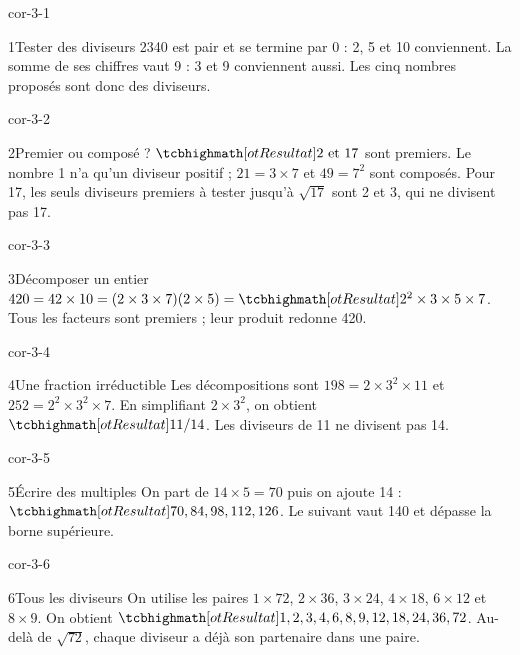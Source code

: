 \clearpage\pagestyle{otMain}\fontsize{11}{15}\selectfont{}
\begin{blocLivre}{cor-3-1}\begin{corrige}{1}{Tester des diviseurs}
2340 est pair et se termine par 0 : 2, 5 et 10 conviennent. La somme de ses chiffres vaut 9 : 3 et 9 conviennent aussi. Les cinq nombres proposés sont donc des diviseurs.
\end{corrige}\end{blocLivre}
\begin{blocLivre}{cor-3-2}\begin{corrige}{2}{Premier ou composé ?}
$\res{2\text{ et }17}$ sont premiers. Le nombre 1 n’a qu’un diviseur positif ; $21=3\times7$ et $49=7^2$ sont composés. Pour 17, les seuls diviseurs premiers à tester jusqu’à $\sqrt{17}$ sont 2 et 3, qui ne divisent pas 17.
\end{corrige}\end{blocLivre}
\begin{blocLivre}{cor-3-3}\begin{corrige}{3}{Décomposer un entier}
$420=42\times10=(2\times3\times7)(2\times5)=\res{2^2\times3\times5\times7}$. Tous les facteurs sont premiers ; leur produit redonne 420.
\end{corrige}\end{blocLivre}
\begin{blocLivre}{cor-3-4}\begin{corrige}{4}{Une fraction irréductible}
Les décompositions sont $198=2\times3^2\times11$ et $252=2^2\times3^2\times7$. En simplifiant $2\times3^2$, on obtient $\res{11/14}$. Les diviseurs de 11 ne divisent pas 14.
\end{corrige}\end{blocLivre}
\begin{blocLivre}{cor-3-5}\begin{corrige}{5}{Écrire des multiples}
On part de $14\times5=70$ puis on ajoute 14 : $\res{70,84,98,112,126}$. Le suivant vaut 140 et dépasse la borne supérieure.
\end{corrige}\end{blocLivre}
\begin{blocLivre}{cor-3-6}\begin{corrige}{6}{Tous les diviseurs}
On utilise les paires $1\times72$, $2\times36$, $3\times24$, $4\times18$, $6\times12$ et $8\times9$. On obtient $\res{1,2,3,4,6,8,9,12,18,24,36,72}$. Au-delà de $\sqrt{72}$, chaque diviseur a déjà son partenaire dans une paire.
\end{corrige}\end{blocLivre}

